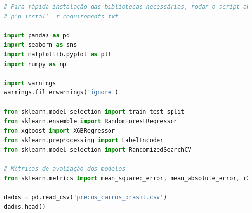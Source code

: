 \begin{lstlisting}[language=Python, style=input]
# Para rápida instalação das bibliotecas necessárias, rodar o script abaixo no CLI:
# pip install -r requirements.txt

import pandas as pd
import seaborn as sns
import matplotlib.pyplot as plt
import numpy as np

import warnings
warnings.filterwarnings('ignore')

from sklearn.model_selection import train_test_split
from sklearn.ensemble import RandomForestRegressor
from xgboost import XGBRegressor
from sklearn.preprocessing import LabelEncoder
from sklearn.model_selection import RandomizedSearchCV

# Métricas de avaliação dos modelos
from sklearn.metrics import mean_squared_error, mean_absolute_error, r2_score

dados = pd.read_csv('precos_carros_brasil.csv')
dados.head()
\end{lstlisting}


\begin{table}[H]
\centering
\begin{tcolorbox}[myoutputstyle, width=1.1\textwidth, enlarge left by=-1cm]
\renewcommand{\arraystretch}{1.2} %
\setlength{\tabcolsep}{6pt} %
\end{tcolorbox}
\end{table}

